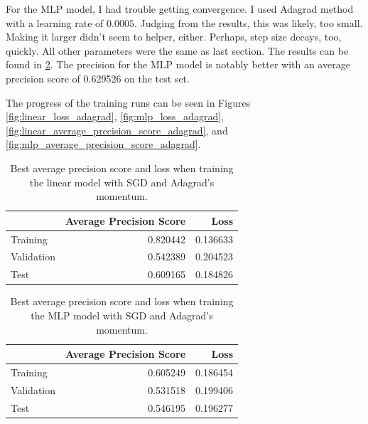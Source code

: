\documentclass[letterpaper,11pt]{article}
\begin{document}
  For the MLP model, I had trouble getting convergence. I used Adagrad method
  with a learning rate of $0.0005$. Judging from the results, this was likely,
  too small. Making it larger didn't seem to helper, either. Perhaps, step size
  decays, too, quickly. All other parameters were the same as last section. The
  results can be found in \ref{tab:mlp_adagrad}. The precision for the MLP model
  is notably better with an average precision score of 0.629526 on the test set.

  The progress of the training runs can be seen in Figures
  \ref{fig:linear_loss_adagrad}, \ref{fig:mlp_loss_adagrad},
  \ref{fig:linear_average_precision_score_adagrad}, and
  \ref{fig:mlp_average_precision_score_adagrad}.

  \begin{table}
    \centering
    \begin{tabular}{lrr}
      \toprule
      {} &  Average Precision Score &      Loss \\
      \midrule
      Training   &                 0.820442 &  0.136633 \\
      Validation &                 0.542389 &  0.204523 \\
      Test       &                 0.609165 &  0.184826 \\
      \bottomrule
    \end{tabular}
    \caption{Best average precision score and loss when training the linear
      model with SGD and Adagrad's momentum.}
    \label{tab:linear_adagrad}
  \end{table}

    \begin{table}
      \centering
      \begin{tabular}{lrr}
        \toprule
        {} &  Average Precision Score &      Loss \\
        \midrule
        Training   &                 0.605249 &  0.186454 \\
        Validation &                 0.531518 &  0.199406 \\
        Test       &                 0.546195 &  0.196277 \\
        \bottomrule
      \end{tabular}
      \caption{Best average precision score and loss when training the MLP
        model with SGD and Adagrad's momentum.}
    \label{tab:mlp_adagrad}
  \end{table}
\end{document}
